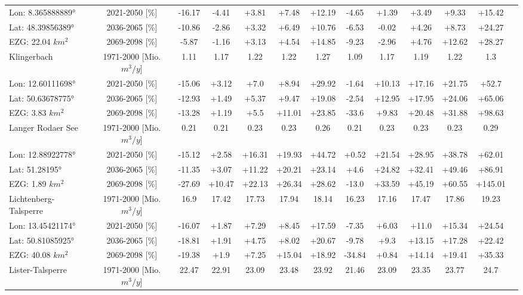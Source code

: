 \begin{longtable}{@{\extracolsep{\fill}}lc|ccccc||cccccc}
\cline{2-13} 
Lon: 8.365888889° & 2021-2050 [\%]  & -16.17 & -4.41 & +3.81 & +7.48 & +12.19 & -4.65 & +1.39 & +3.49 & +9.33 & +15.42 & \\ 
Lat: 48.39856389° & 2036-2065 [\%]  & -10.86 & -2.86 & +3.32 & +6.49 & +10.76 & -6.53 & -0.02 & +4.26 & +8.73 & +24.27 & \\ 
EZG: 22.04 $km^2$ & 2069-2098 [\%]  & -5.87 & -1.16 & +3.13 & +4.54 & +14.85 & -9.23 & -2.96 & +4.76 & +12.62 & +28.27 & \\ 
\hline 
Klingerbach & 1971-2000 [Mio. $m^3/y$]  & 1.11 & 1.17 & 1.22 & 1.22 & 1.27 & 1.09 & 1.17 & 1.19 & 1.22 & 1.3 & \\ 
\cline{2-13} 
Lon: 12.60111698° & 2021-2050 [\%]  & -15.06 & +3.12 & +7.0 & +8.94 & +29.92 & -1.64 & +10.13 & +17.16 & +21.75 & +52.7 & \\ 
Lat: 50.63678775° & 2036-2065 [\%]  & -12.93 & +1.49 & +5.37 & +9.47 & +19.08 & -2.54 & +12.95 & +17.95 & +24.06 & +65.06 & \\ 
EZG: 3.83 $km^2$ & 2069-2098 [\%]  & -13.28 & +1.19 & +5.5 & +11.01 & +23.85 & -33.6 & +9.83 & +20.48 & +31.88 & +98.63 & \\ 
\hline 
Langer Rodaer See & 1971-2000 [Mio. $m^3/y$]  & 0.21 & 0.21 & 0.23 & 0.23 & 0.26 & 0.21 & 0.23 & 0.23 & 0.23 & 0.29 & \\ 
\cline{2-13} 
Lon: 12.88922778° & 2021-2050 [\%]  & -15.12 & +2.58 & +16.31 & +19.93 & +44.72 & +0.52 & +21.54 & +28.95 & +38.78 & +62.01 & \\ 
Lat: 51.28195° & 2036-2065 [\%]  & -11.35 & +3.07 & +11.22 & +20.21 & +23.14 & +4.6 & +24.82 & +32.41 & +49.46 & +86.91 & \\ 
EZG: 1.89 $km^2$ & 2069-2098 [\%]  & -27.69 & +10.47 & +22.13 & +26.34 & +28.62 & -13.0 & +33.59 & +45.19 & +60.55 & +145.01 & \\ 
\hline 
Lichtenberg-Talsperre & 1971-2000 [Mio. $m^3/y$]  & 16.9 & 17.42 & 17.73 & 17.94 & 18.14 & 16.23 & 17.16 & 17.47 & 17.86 & 19.23 & \\ 
\cline{2-13} 
Lon: 13.45421174° & 2021-2050 [\%]  & -16.07 & +1.87 & +7.29 & +8.45 & +17.59 & -7.35 & +6.03 & +11.0 & +15.34 & +24.54 & \\ 
Lat: 50.81085925° & 2036-2065 [\%]  & -18.81 & +1.91 & +4.75 & +8.02 & +20.67 & -9.78 & +9.3 & +13.15 & +17.28 & +22.42 & \\ 
EZG: 40.08 $km^2$ & 2069-2098 [\%]  & -19.38 & +1.9 & +7.25 & +15.04 & +18.92 & -34.84 & +0.84 & +14.14 & +19.41 & +35.33 & \\ 
\hline 
Lister-Talsperre & 1971-2000 [Mio. $m^3/y$]  & 22.47 & 22.91 & 23.09 & 23.48 & 23.92 & 21.46 & 23.09 & 23.35 & 23.77 & 24.7 & \\ 

\end{longtable}
